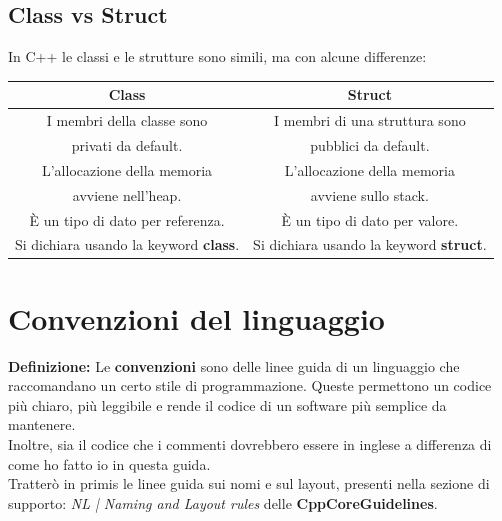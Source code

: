 \subsection{Class vs Struct}

\textsf{\small In C++ le classi e le strutture sono simili, ma con alcune differenze:} \break

\begin{tabular}{|c|c|}
	\hline
	\textbf{Class} & \textbf{Struct} \\
	\hline
	\textsf{\small I membri della classe sono } & \textsf{\small I membri di una struttura sono } \\
	\textsf{\small privati da default.} & \textsf{\small pubblici da default.} \\
	\hline
	\textsf{\small L'allocazione della memoria } & \textsf{\small L'allocazione della memoria } \\
	\textsf{\small avviene nell'heap.} & \textsf{\small avviene sullo stack.} \\
	\hline
	\textsf{\small È un tipo di dato per referenza.} & \textsf{\small È un tipo di dato per valore.} \\
	\hline
	\textsf{\small Si dichiara usando la keyword \textbf{class}.} & \textsf{\small Si dichiara usando la keyword \textbf{struct}.} \\
	\hline
\end{tabular}


\newpage

\section{Convenzioni del linguaggio}

\textsf{\small \textbf{Definizione: } Le \textbf{convenzioni} sono delle linee guida di un linguaggio che raccomandano un certo stile di programmazione. Queste permettono un codice più chiaro, più leggibile e rende il codice di un software più semplice da mantenere.} \\

\textsf{\small Inoltre, sia il codice che i commenti dovrebbero essere in inglese a differenza di come ho fatto io in questa guida.} \\

\textsf{\small Tratterò in primis le linee guida sui nomi e sul layout, presenti nella sezione di supporto: \emph{NL | Naming and Layout rules} delle \textbf{CppCoreGuidelines}.} \break

